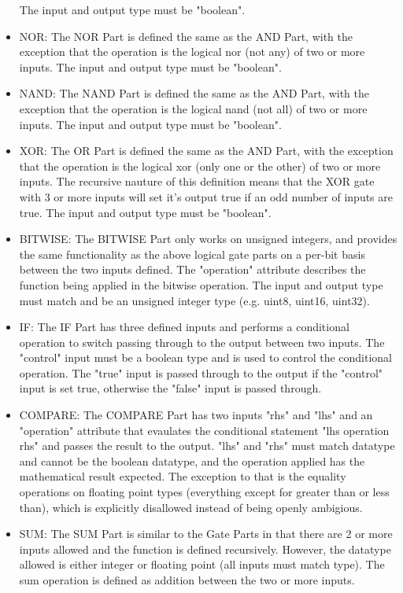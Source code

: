 \documentclass[titlepage]{article}
\begin{document}
\begin{itemize}[label={}]
The input and output type must be "boolean".
    \item NOR:
The NOR Part is defined the same as the AND Part, with the exception that the operation is the logical nor (not any) of two or more inputs.
The input and output type must be "boolean".
    \item NAND:
The NAND Part is defined the same as the AND Part, with the exception that the operation is the logical nand (not all) of two or more inputs.
The input and output type must be "boolean".
    \item XOR:
The OR Part is defined the same as the AND Part, with the exception that the operation is the logical xor (only one or the other) of two or more inputs.
The recursive nauture of this definition means that the XOR gate with 3 or more inputs will set it's output true if an odd number of inputs are true.
The input and output type must be "boolean".
    \item BITWISE:
The BITWISE Part only works on unsigned integers, and provides the same functionality as the above logical gate parts on a per-bit basis between the two inputs defined.
The "operation" attribute describes the function being applied in the bitwise operation.
The input and output type must match and be an unsigned integer type (e.g. uint8, uint16, uint32).
    \item IF:
The IF Part has three defined inputs and performs a conditional operation to switch passing through to the output between two inputs.
The "control" input must be a boolean type and is used to control the conditional operation.
The "true" input is passed through to the output if the "control" input is set true, otherwise the "false" input is passed through.
    \item COMPARE:
The COMPARE Part has two inputs "rhs" and "lhs" and an "operation" attribute that evaulates the conditional statement "lhs operation rhs" and passes the result to the output.
"lhs" and "rhs" must match datatype and cannot be the boolean datatype, and the operation applied has the mathematical result expected.
The exception to that is the equality operations on floating point types (everything except for greater than or less than), which is explicitly disallowed instead of being openly ambigious.
    \item SUM:
The SUM Part is similar to the Gate Parts in that there are 2 or more inputs allowed and the function is defined recursively.
However, the datatype allowed is either integer or floating point (all inputs must match type).
The sum operation is defined as addition between the two or more inputs.

\end{itemize}
\end{document}
